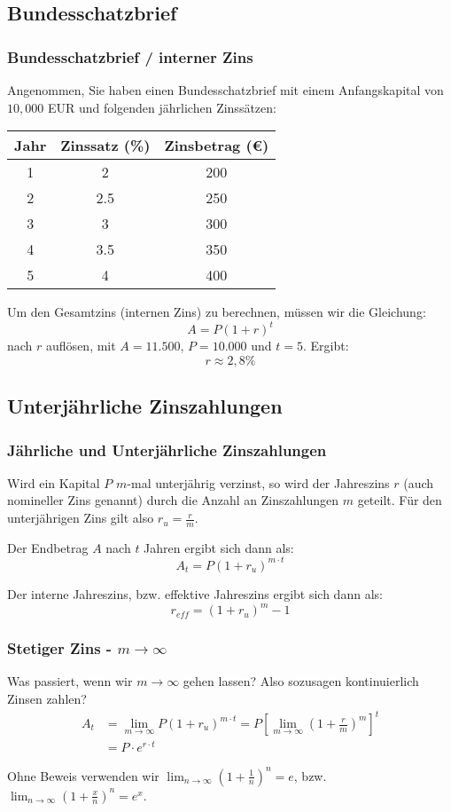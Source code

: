 \documentclass{beamer}
\begin{document}
\subsection{Bundesschatzbrief}
\begin{frame}
  \frametitle{Bundesschatzbrief / interner Zins}

  Angenommen, Sie haben einen Bundesschatzbrief mit einem Anfangskapital von $10,000$ EUR und folgenden jährlichen Zinssätzen:
  \begin{center}
    \begin{tabular}{|c|c|c|}
      \hline
      \textbf{Jahr} & \textbf{Zinssatz (\%)} & \textbf{Zinsbetrag (€)} \\
      \hline
      1 & 2 & 200\\
      2 & 2.5 & 250 \\
      3 & 3 & 300\\
      4 & 3.5 & 350\\
      5 & 4 & 400\\
      \hline
    \end{tabular}
  \end{center}
  Um den Gesamtzins (internen Zins) zu berechnen, müssen wir die Gleichung:
  $$ A = P (1+r)^t$$
  nach $r$ auflösen, mit $A=11.500$, $P=10.000$ und $t = 5$. Ergibt: 
  $$r\approx 2,8\%$$
\end{frame}

\subsection{Unterjährliche Zinszahlungen}
\begin{frame}
  \frametitle{Jährliche und Unterjährliche Zinszahlungen}
  Wird ein Kapital $P$ $m$-mal unterjährig verzinst, so wird der Jahreszins $r$ (auch nomineller Zins genannt) durch die Anzahl
  an Zinszahlungen $m$ geteilt. Für den unterjährigen Zins gilt also $r_u = \frac{r}{m}$.

  Der Endbetrag $A$ nach $t$ Jahren ergibt sich dann als:
  \[A_t = P(1+r_u)^{m\cdot t}\]

  Der interne Jahreszins, bzw. effektive Jahreszins ergibt sich dann als:
  $$r_{eff}=(1+r_u)^m-1$$

\end{frame}

\begin{frame}
  \frametitle{Stetiger Zins - $m\to\infty$}
  Was passiert, wenn wir $m\to \infty$ gehen lassen? Also sozusagen kontinuierlich Zinsen zahlen?
  \begin{align*}
    A_t &= \lim_{m\to\infty} P(1+r_u)^{m\cdot t}=P[\lim_{m\to\infty} (1+\frac{r}{m})^{m}] ^t\\  
        &=P\cdot e^{r\cdot t}
  \end{align*}
  
  \vspace*{2cm}

  Ohne Beweis verwenden wir $\lim_{n\to\infty}(1+\frac{1}{n})^n=e$, bzw. $\lim_{n\to\infty}(1+\frac{x}{n})^n=e^x$.
\end{frame}
\end{document}
